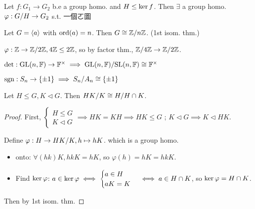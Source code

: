 \begin{theorem}
  Let $f: G_1 \to G_2$ b.e a group homo. and $H \le \operatorname{ker} f$. Then
  $\exists$ a group homo. $\varphi: {G}/{H} \to G_2$ s.t.
  一個ㄛ圖
\end{theorem}

\begin{example}
  Let $G = \langle a\rangle$ with $\operatorname{ord}(a) = n$. Then $G \cong {\mathbb{Z}}/{n\mathbb{Z}}$.
  (1st isom. thm.)
\end{example}

\begin{example}
  $\varphi: \mathbb{Z} \to {\mathbb{Z}}/{2\mathbb{Z}}, 4\mathbb{Z} \le 2\mathbb{Z}$, so by factor thm.,
  ${\mathbb{Z}}/{4\mathbb{Z}} \to {\mathbb{Z}}/{2\mathbb{Z}}$.
\end{example}

\begin{example}
  $\det: \text{GL}(n, \mathbb{F}) \to \mathbb{F}^\times \implies
  {\text{GL}(n, \mathbb{F})}/{\text{SL}(n, \mathbb{F})} \cong \mathbb{F}^\times$
\end{example}

\begin{example}
  $\operatorname{sgn}: S_n \to \{ \pm 1 \} \implies {S_n}/{A_n} \cong \{ \pm 1 \}$
\end{example}

\begin{theorem}
  Let $H \le G, K \lhd G$. Then ${HK}/{K} \cong {H}/{H\cap K}$.
  \begin{proof}
    First, $\begin{cases}H\le G \\ K \lhd G\end{cases} \implies HK = KH
      \implies HK \le G$ ; $K \lhd G \implies K \lhd HK$.

    Define $\varphi: H \to {HK}/{K}, h \mapsto hK$. which is a group homo.
    \begin{itemize}
      \item onto: $\forall (hk) K, hkK = hK$, so $\varphi(h) = hK = hkK$.
      \item Find $\operatorname{ker} \varphi$: $a \in \operatorname{ker} \varphi \iff \begin{cases}
          a \in H \\
          aK = K
        \end{cases} \iff a \in H \cap K$, so $\operatorname{ker} \varphi = H\cap K$.
    \end{itemize}
    Then by 1st isom. thm.
  \end{proof}
\end{theorem}

